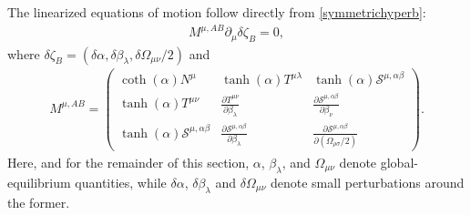 \documentclass[12pt,aps,prd,nofootinbib,noshowkeys,noshowpacs,longbibliography,
superscriptaddress,tightenlines,floatfix,preprintnumbers]{revtex4-2}
\newcommand{\p}{\partial}
\begin{document}
The linearized equations of motion follow directly from \eqref{symmetrichyperb}:
\begin{align} \label{lineom}
    M^{\mu,AB}\p_\mu \delta \zeta_B = 0,
\end{align}
where $\delta\zeta_B = (\delta \alpha, \delta \beta_\lambda, \delta\Omega_{\mu\nu}/2)$ and
\begin{align} \label{MKT}
	M^{\mu, AB} =
	\begin{pmatrix}
		\coth(\alpha)N^\mu & \tanh(\alpha)T^{\mu\lambda} & \tanh(\alpha) \mathcal S^{\mu,\alpha\beta} \\
		\tanh(\alpha)T^{\mu\nu} & \frac{\p T^{\mu\nu}}{\p \beta_\lambda} & \frac{\p \mathcal S^{\mu,\alpha\beta}}{\p \beta_\nu} \\
		\tanh(\alpha)\mathcal S^{\mu, \alpha\beta} & \frac{\partial \mathcal S^{\mu,\alpha\beta}}{\p \beta_\lambda} & \frac{\p\mathcal S^{\mu,\alpha\beta}}{\p (\Omega_{\rho\sigma}/2)}
	\end{pmatrix}.
\end{align}
Here, and for the remainder of this section, $\alpha$, $\beta_\lambda$, and $\Omega_{\mu\nu}$ denote global-equilibrium quantities, while $\delta\alpha$, $\delta\beta_\lambda$ and $\delta \Omega_{\mu\nu}$ denote small perturbations around the former.
\end{document}
